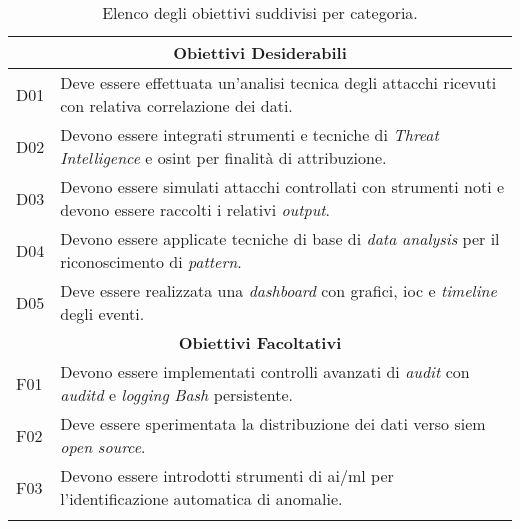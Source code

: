 \begin{center}
\begin{longtable}{|p{}|p{}|}
\multicolumn{2}{|c|}{\textbf{Obiettivi Desiderabili}} \\ \hline
D01 & Deve essere effettuata un'analisi tecnica degli attacchi ricevuti con relativa correlazione dei dati. \\ \hline
D02 & Devono essere integrati strumenti e tecniche di \textit{Threat Intelligence} e \gls{osint}\glsadd{osint_def} per finalità di attribuzione. \\ \hline
D03 & Devono essere simulati attacchi controllati con strumenti noti e devono essere raccolti i relativi \textit{output}. \\ \hline
D04 & Devono essere applicate tecniche di base di \textit{data analysis} per il riconoscimento di \textit{pattern}. \\ \hline
D05 & Deve essere realizzata una \textit{dashboard} con grafici, \gls{ioc}\glsadd{ioc_def} e \textit{timeline} degli eventi. \\ \hline

\multicolumn{2}{|c|}{\textbf{Obiettivi Facoltativi}} \\ \hline
F01 & Devono essere implementati controlli avanzati di \textit{audit} con \textit{auditd} e \textit{logging} \textit{Bash} persistente. \\ \hline
F02 & Deve essere sperimentata la distribuzione dei dati verso \gls{siem}\glsadd{siem_def} \textit{open source}. \\ \hline
F03 & Devono essere introdotti strumenti di \gls{ai}/\gls{ml} per l'identificazione automatica di anomalie. \\ \hline

\caption{Elenco degli obiettivi suddivisi per categoria.}
\label{tab:obiettivi}
\end{longtable}
\end{center}
